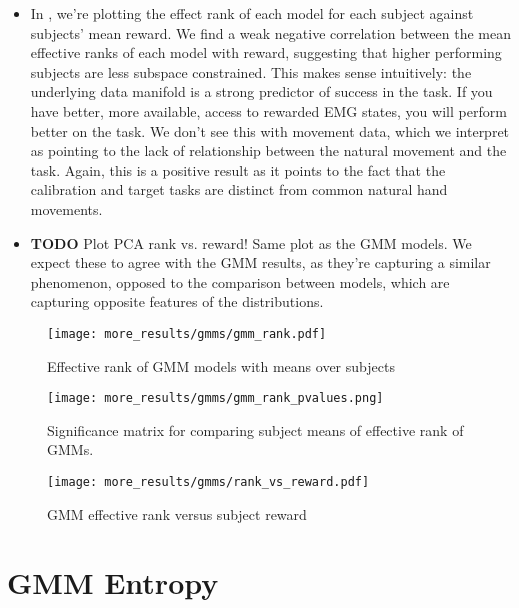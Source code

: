 \documentclass[../main.tex]{subfiles}
\begin{document}
\begin{itemize}
  \item In , we're plotting the effect rank of each model for each subject against subjects' mean reward. We find a weak negative correlation between the mean effective ranks of each model with reward, suggesting that higher performing subjects are less subspace constrained. This makes sense intuitively: the underlying data manifold is a strong predictor of success in the task. If you have better, more available, access to rewarded EMG states, you will perform better on the task. We don't see this with movement data, which we interpret as pointing to the lack of relationship between the natural movement and the task. Again, this is a positive result as it points to the fact that the calibration and target tasks are distinct from common natural hand movements.
  \item \textbf{TODO} Plot PCA rank vs. reward! Same plot as the GMM models. We expect these to agree with the GMM results, as they're capturing a similar phenomenon, opposed to the comparison between models, which are capturing opposite features of the distributions.
\end{itemize}

\begin{figure}[H]%
  \centering
    \texttt{[image: more\_results/gmms/gmm\_rank.pdf]}
    \caption[GMM effective rank over subjects]{Effective rank of GMM models with means over subjects}\label{fig:gmm_rank}
\end{figure}

\begin{figure}[H]%
  \centering
    \texttt{[image: more\_results/gmms/gmm\_rank\_pvalues.png]}
    \caption[GMM effective rank significance matrix]{Significance matrix for comparing subject means of effective rank of GMMs.}\label{fig:gmm_rank_pvalues}
\end{figure}

\begin{figure}[H]%
  \centering
    \texttt{[image: more\_results/gmms/rank\_vs\_reward.pdf]}
    \caption[GMM effective rank versus subject reward]{GMM effective rank versus subject reward}\label{fig:rank_vs_reward}
\end{figure}


\section{GMM Entropy}
\end{document}
